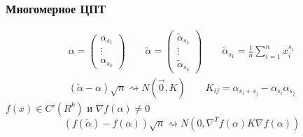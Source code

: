 \documentclass{article}
\begin{document}
\subsubsection{Многомерное ЦПТ}
\begin{gather*}
  \alpha=\begin{pmatrix}
    \alpha_{s_1} \\ \vdots \\ \alpha_{s_k}
  \end{pmatrix}
  \qquad 
  \tilde\alpha=\begin{pmatrix}
    \tilde{\alpha}_{s_1} \\ \vdots \\ \tilde{\alpha}_{s_k}
  \end{pmatrix}
  \qquad
  \tilde{\alpha}_{s_1}=\frac{1}{n}\sum_{i=1}^{n}x_i^{s_1} \\ 
  (\tilde{\alpha}-\alpha)\sqrt{n}\rightsquigarrow N(\vec{0},K) \qquad K_{ij}=\alpha_{s_i+s_j}-\alpha_{s_i}\alpha_{s_j}
\end{gather*}
$f(x)\in C'(R^{k})$ и $\nabla f(\alpha)\neq 0$
\[
  (f(\tilde{\alpha})-f(\alpha))\sqrt{n} \rightsquigarrow N(0, \nabla^{T}f(\alpha)K\nabla f(\alpha))
\]
\end{document}
